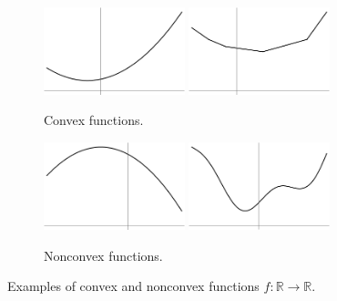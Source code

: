 \documentclass[11pt]{article}
\theoremstyle{definition} %
\begin{document}
\begin{figure}[h]
	\centering
	
	\begin{subfigure}{0.45\textwidth}
		\centering
		\includegraphics[width=0.45\textwidth]{figures/convexfunction01.png} \quad \includegraphics[width=0.45\textwidth]{figures/convexfunction02.png}
		\caption{Convex functions.}
	\end{subfigure}
	\hfill
	\begin{subfigure}{0.45\textwidth}
		\centering
		\includegraphics[width=0.45\textwidth]{figures/nonconvexfunction01.png} \quad \includegraphics[width=0.45\textwidth]{figures/nonconvexfunction02.png}
		\caption{Nonconvex functions.}
	\end{subfigure}
	
	\caption{Examples of convex and nonconvex functions $f : \mathbb{R} \to \mathbb{R}$.}
	\label{fig:convexfunction}
\end{figure}
\end{document}
